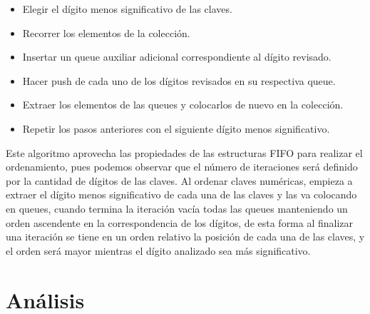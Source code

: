 \documentclass[11pt]{article}
\begin{document}
\begin{itemize}
\item Elegir el dígito menos significativo de las claves.
\item Recorrer los elementos de la colección.
\item Insertar un queue auxiliar adicional correspondiente al dígito revisado.
\item Hacer push de cada uno de los dígitos revisados en su respectiva queue.
\item Extraer los elementos de las queues y colocarlos de nuevo en la colección.
\item Repetir los pasos anteriores con el siguiente dígito menos significativo.
\end{itemize}

\par
Este algoritmo aprovecha las propiedades de las estructuras FIFO para realizar el ordenamiento, pues podemos observar que el número de iteraciones será definido por la cantidad de dígitos de las claves. Al ordenar claves numéricas, empieza a extraer el dígito menos significativo de cada una de las claves y las va colocando en queues, cuando termina la iteración vacía todas las queues manteniendo un orden ascendente en la correspondencia de los dígitos, de esta forma al finalizar una iteración se tiene en un orden relativo la posición de cada una de las claves, y el orden será mayor mientras el dígito analizado sea más significativo.

\section{Análisis}
\end{document}
